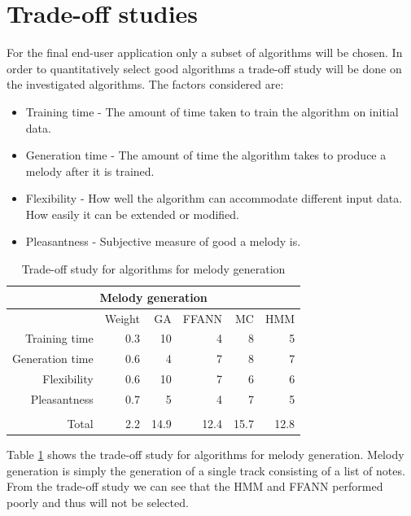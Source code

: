 \section{Trade-off studies}
For the final end-user application only a subset of algorithms will be chosen. In order to quantitatively select good algorithms a trade-off study will be done on the investigated algorithms. The factors considered are:
\begin{itemize}
\item Training time - The amount of time taken to train the algorithm on initial data.
\item Generation time - The amount of time the algorithm takes to produce a melody after it is trained.
\item Flexibility - How well the algorithm can accommodate different input data. How easily it can be extended or modified.
\item Pleasantness - Subjective measure of good a melody is.
\end{itemize}
\begin{table}[htbp]
  \centering
  \caption{Trade-off study for algorithms for melody generation}
    \begin{tabular}{rr|rrrr}
    \toprule
    \multicolumn{6}{c}{Melody generation} \\
    \midrule
          & Weight & GA    & FFANN & MC    & HMM \\
    \midrule 
    Training time & 0.3   & 10    & 4     & 8     & 5 \\
    Generation time & 0.6   & 4     & 7     & 8     & 7 \\
    Flexibility & 0.6   & 10    & 7     & 6     & 6 \\
    Pleasantness & 0.7   & 5     & 4     & 7     & 5 \\
          &       &       &       &       &  \\
          \bottomrule
    Total & 2.2   & 14.9  & 12.4  & 15.7  & 12.8 \\
    \bottomrule
    \end{tabular}%
  \label{tab:tomelgen}%
\end{table}%

Table \ref{tab:tomelgen} shows the trade-off study for algorithms for melody generation. Melody generation is simply the generation of a single track consisting of a list of notes. From the trade-off study we can see that the \ac{HMM} and \ac{FFANN} performed poorly and thus will not be selected.

